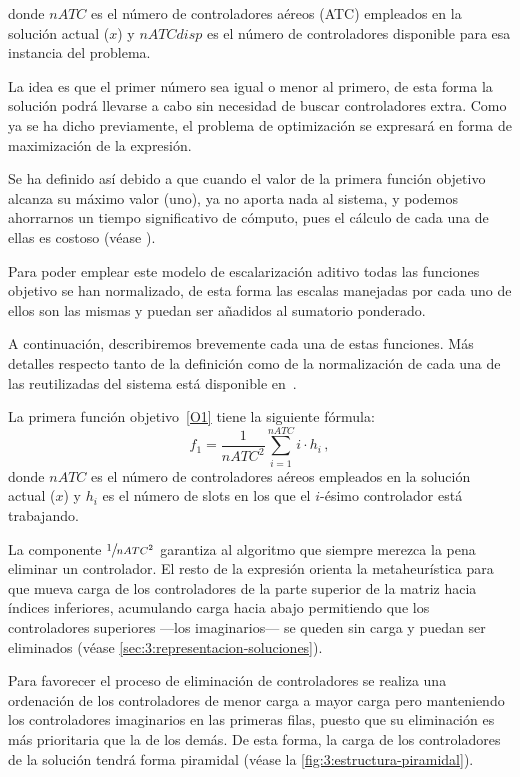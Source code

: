 donde $nATC$ es el número de controladores aéreos (ATC) empleados en la solución actual ($x$) y $nATCdisp$ es el número de controladores disponible para esa instancia del problema. 

La idea es que el primer número sea igual o menor al primero, de esta forma la solución podrá llevarse a cabo sin necesidad de buscar controladores extra. Como ya se ha dicho previamente, el problema de optimización se expresará en forma de maximización de la expresión.

Se ha definido así debido a que cuando el valor de la primera función objetivo alcanza su máximo valor (uno), ya no aporta nada al sistema, y podemos ahorrarnos un tiempo significativo de cómputo, pues el cálculo de cada una de ellas es costoso (véase ).%

Para poder emplear este modelo de escalarización aditivo todas las funciones objetivo se han normalizado, de esta forma las escalas manejadas por cada uno de ellos son las mismas y puedan ser añadidos al sumatorio ponderado.

A continuación, describiremos brevemente cada una de estas funciones. Más detalles respecto tanto de la definición como de la normalización de cada una de las reutilizadas del sistema \legacy{} está disponible en~\cite{articulo2}.

La primera función objetivo~\ref{O1} tiene la siguiente fórmula:
\[ f_1 = \frac{1}{nATC^2} \sum_{i=1}^{nATC} i\cdot h_i \,, \]
donde $nATC$ es el número de controladores aéreos empleados en la solución actual ($x$) y $h_i$ es el número de slots en los que el $i$-ésimo controlador está trabajando. 

La componente $\sfrac{1}{nATC^2}$ garantiza al algoritmo que siempre merezca la pena eliminar un controlador. El resto de la expresión orienta la metaheurística para que mueva carga de los controladores de la parte superior de la matriz hacia índices inferiores, acumulando carga hacia abajo permitiendo que los controladores superiores ---los imaginarios--- se queden sin carga y puedan ser eliminados (véase \autoref{sec:3:representacion-soluciones}).

Para favorecer el proceso de eliminación de controladores se realiza una ordenación de los controladores de menor carga a mayor carga pero manteniendo los controladores imaginarios en las primeras filas, puesto que su eliminación es más prioritaria que la de los demás. De esta forma, la carga de los controladores de la solución tendrá forma piramidal (véase la \autoref{fig:3:estructura-piramidal}).

